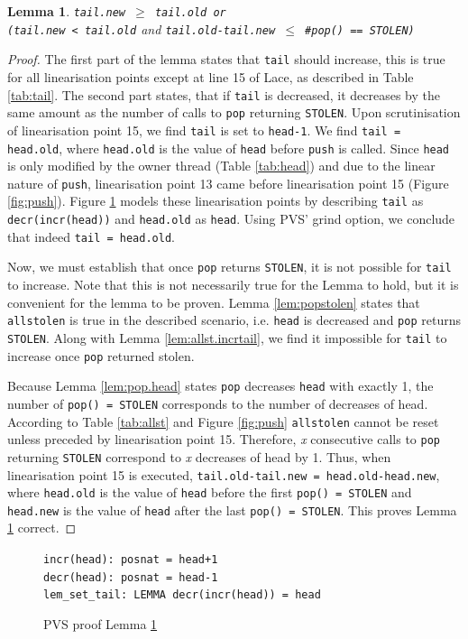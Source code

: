 \documentclass{sig-alternate-br}
\newtheorem{lemma}{Lemma}
\begin{document}
\begin{lemma}
	\texttt{tail.new $\geq$ tail.old or\\(tail.new < tail.old} and \texttt{tail.old-tail.new $\leq$ \#pop() == STOLEN)}
	\label{lem:tail}
\end{lemma}
\begin{proof}
	The first part of the lemma states that \texttt{tail} should increase, this is true for all linearisation points except at line 15 of Lace, as described in Table \ref{tab:tail}.
	The second part states, that if \texttt{tail} is decreased, it decreases by the same amount as the number of calls to \texttt{pop} returning \texttt{STOLEN}.
	Upon scrutinisation of linearisation point 15, we find \texttt{tail} is set to \texttt{head-1}.
	We find \texttt{tail = head.old}, where \texttt{head.old} is the value of \texttt{head} before \texttt{push} is called.
	Since \texttt{head} is only modified by the owner thread (Table \ref{tab:head}) and due to the linear nature of \texttt{push}, linearisation point 13 came before linearisation point 15 (Figure \ref{fig:push}).
	Figure \ref{pvs:tail} models these linearisation points by describing \texttt{tail} as \texttt{decr(incr(head))} and \texttt{head.old} as \texttt{head}.
	Using PVS' grind option, we conclude that indeed \texttt{tail = head.old}.
	
	Now, we must establish that once \texttt{pop} returns \texttt{STOLEN}, it is not possible for \texttt{tail} to increase.
	Note that this is not necessarily true for the Lemma to hold, but it is convenient for the lemma to be proven.
	Lemma \ref{lem:popstolen} states that \texttt{allstolen} is true in the described scenario, i.e. \texttt{head} is decreased and \texttt{pop} returns \texttt{STOLEN}.
	Along with Lemma \ref{lem:allst.incrtail}, we find it impossible for \texttt{tail} to increase once \texttt{pop} returned stolen.
	
	Because Lemma \ref{lem:pop.head} states \texttt{pop} decreases \texttt{head} with exactly 1, the number of \texttt{pop() = STOLEN} corresponds to the number of decreases of head.
	According to Table \ref{tab:allst} and Figure \ref{fig:push} \texttt{allstolen} cannot be reset unless preceded by linearisation point 15.
	Therefore, \emph{x} consecutive calls to \texttt{pop} returning \texttt{STOLEN} correspond to \emph{x} decreases of head by 1.
	Thus, when linearisation point 15 is executed, \texttt{tail.old-tail.new = head.old-head.new}, where \texttt{head.old} is the value of \texttt{head} before the first \texttt{pop() = STOLEN} and \texttt{head.new} is the value of \texttt{head} after the last \texttt{pop() = STOLEN}.
	This proves Lemma \ref{lem:tail} correct.
\end{proof}
\begin{figure}[h]
	\texttt{incr(head): posnat = head+1}\\
	\texttt{decr(head): posnat = head-1}\\
	\texttt{lem\_set\_tail: LEMMA decr(incr(head)) = head}
	\caption{PVS proof Lemma \ref{lem:tail}}
	\label{pvs:tail}
\end{figure}
\end{document}
